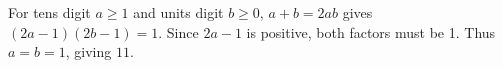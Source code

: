 For tens digit $a\ge1$ and units digit $b\ge0$, $a+b=2ab$ gives $(2a-1)(2b-1)=1$. Since $2a-1$ is positive, both factors must be 1. Thus $a=b=1$, giving $\boxed{11}$.
